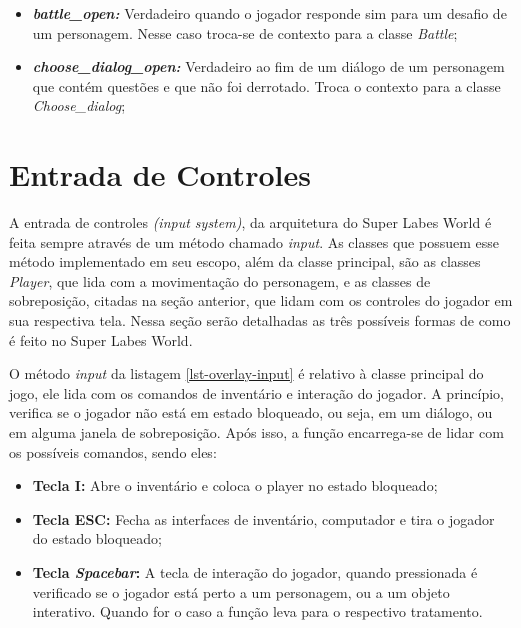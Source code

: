 \begin{enumerate}
\begin{itemize}
        \item \textit{\textbf{battle\_open: }}  Verdadeiro quando o jogador responde sim para um desafio de um personagem. Nesse caso troca-se de contexto para a classe \textit{Battle};
        \item \textit{\textbf{choose\_dialog\_open: }} Verdadeiro ao fim de um diálogo de um personagem que contém questões e que não foi derrotado. Troca o contexto para a classe \textit{Choose\_dialog};
    \end{itemize}
\end{enumerate}


\section{Entrada de Controles}
A entrada de controles \textit{(input system)}, da arquitetura do Super Labes World é feita sempre através de um método chamado \textit{input}. As classes que possuem esse método implementado em seu escopo, além da classe principal, são as classes \textit{Player}, que lida com a movimentação do personagem, e as classes de sobreposição, citadas na seção anterior, que lidam com os controles do jogador em sua respectiva tela. Nessa seção serão detalhadas as três possíveis formas de como é feito no Super Labes World.

O método \textit{input} da listagem \ref{lst-overlay-input} é relativo à classe principal do jogo, ele lida com os comandos de inventário e interação do jogador. A princípio, verifica se o jogador não está em estado bloqueado, ou seja, em um diálogo, ou em alguma janela de sobreposição. Após isso, a função encarrega-se de lidar com os possíveis comandos, sendo eles:
\begin{itemize}
    \item \textbf{Tecla I: }Abre o inventário e coloca o player no estado bloqueado;
    \item \textbf{Tecla ESC: }Fecha as interfaces de inventário, computador e tira o jogador do estado bloqueado;
    \item \textbf{Tecla \textit{Spacebar}: }A tecla de interação do jogador, quando pressionada é verificado se o jogador está perto a um personagem, ou a um objeto interativo. Quando for o caso a função leva para o respectivo tratamento.
\end{itemize}

 

